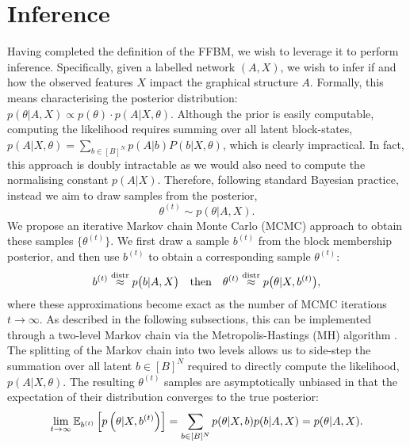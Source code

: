 \section{Inference}
\label{sec:inference}

Having completed the definition of the FFBM, we wish to leverage it 
to perform inference. Specifically, given a labelled network $(A, X)$, we wish to infer if and how the observed features $X$ impact the graphical structure $A$. Formally,
this means characterising the posterior distribution:
$
p(\theta|A, X) \propto p(\theta) \cdot p(A | X, \theta).
$
Although the prior is easily computable, 
computing the likelihood 
requires summing over all latent block-states, 
$p(A| X, \theta) = \sum_{b \in [B]^N} p(A | b) P(b | X, \theta)$, which is 
clearly impractical. In fact, this
approach is doubly intractable as we would also 
need to compute the normalising constant $p(A|X)$.
Therefore, following standard Bayesian practice,
instead we aim to draw samples from the posterior,
%
\begin{equation}
	\label{eqn:theta-target}
	\theta^{(t)} \sim p(\theta | A, X).
\end{equation}
%
We propose an iterative Markov chain Monte Carlo
(MCMC) approach to obtain these samples
$\{\theta^{(t)}\}$. We first draw a sample $b^{(t)}$ 
from the block membership posterior,
and then use $b^{(t)}$ to obtain a corresponding
sample $\theta^{(t)}$:
%
\begin{equation}
	b^{(t)} \stackrel{\rm distr}{\approx} p \big( b | A, X \big) 
	\quad \textrm{then} \quad
	\theta^{(t)} \stackrel{\rm distr}{\approx} 
	p\big(\theta | X, b^{(t)} \big),
\end{equation}
%
where these approximations become exact as
the number of MCMC iterations $t\to\infty$.
As described in the following subsections,
this can be implemented through a two-level
Markov chain via the Metropolis-Hastings (MH) 
algorithm \cite{hastings-alg}.
The splitting of the Markov chain into two levels allows us to side-step the summation over
all latent $b \in [B]^N$ required to directly compute the likelihood, $p(A| X, \theta)$.
The resulting $\theta^{(t)}$ samples are asymptotically
unbiased in that the expectation of 
their distribution converges to the true posterior:
%
\begin{equation}
\lim_{t\to\infty}
\mathbb{E}_{b^{(t)}} \left[p \left( \theta | X, b^{(t)} \right) \right] = \sum_{b \in [B]^N} p(\theta | X, b) p(b | A, X) = p(\theta | A, X).
\label{eqn:theta-unbiased}
\end{equation}
